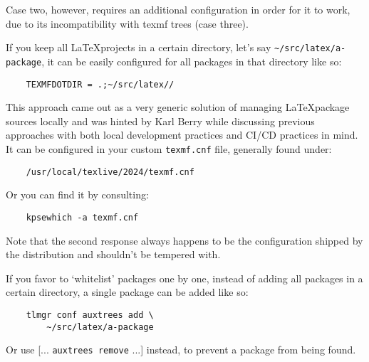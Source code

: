 \documentclass{xdpdoc}
\begin{document}
\begin{multicols}{2}
        Case two, however, requires an additional configuration in order for it to work, due to its incompatibility with texmf trees (case three).\\
        \label{fig:project dir}\bigskip

        If you keep all \LaTeX projects in a certain directory, let's say \texttt{\textasciitilde/src/latex/a-package}, it can be easily configured for all packages in that directory like so:
        \begin{lstlisting}
    TEXMFDOTDIR = .;~/src/latex//
        \end{lstlisting}
        This approach came out as a very generic solution of managing \LaTeX package sources locally and was hinted by Karl Berry while discussing previous approaches with both local development practices and CI/CD practices in mind.
        It can be configured in your custom \texttt{texmf.cnf} file, generally found under:
        \begin{lstlisting}
    /usr/local/texlive/2024/texmf.cnf
        \end{lstlisting}
        Or you can find it by consulting:
        \begin{lstlisting}
    kpsewhich -a texmf.cnf
        \end{lstlisting}
        Note that the second response always happens to be the configuration shipped by the \TeXLive distribution and shouldn't be tempered with.

        If you favor to `whitelist' packages one by one, instead of adding all packages in a certain directory, a single package can be added like so:
        \begin{lstlisting}
    tlmgr conf auxtrees add \
        ~/src/latex/a-package
        \end{lstlisting}
        Or use [... \texttt{auxtrees remove} ...] instead, to prevent a package from being found.


\end{multicols}
\end{document}
